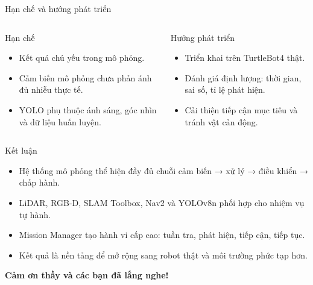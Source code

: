 ﻿\documentclass[aspectratio=169,11pt]{beamer}
\begin{document}
\begin{frame}{Hạn chế và hướng phát triển}
\begin{columns}[T]
\begin{block}{Hạn chế}
\begin{itemize}
  \item Kết quả chủ yếu trong mô phỏng.
  \item Cảm biến mô phỏng chưa phản ánh đủ nhiễu thực tế.
  \item YOLO phụ thuộc ánh sáng, góc nhìn và dữ liệu huấn luyện.
\end{itemize}
\end{block}
\begin{block}{Hướng phát triển}
\begin{itemize}
  \item Triển khai trên TurtleBot4 thật.
  \item Đánh giá định lượng: thời gian, sai số, tỉ lệ phát hiện.
  \item Cải thiện tiếp cận mục tiêu và tránh vật cản động.
\end{itemize}
\end{block}
\end{columns}
\end{frame}

\begin{frame}{Kết luận}
\begin{itemize}
  \item Hệ thống mô phỏng thể hiện đầy đủ chuỗi cảm biến → xử lý → điều khiển → chấp hành.
  \item LiDAR, RGB-D, SLAM Toolbox, Nav2 và YOLOv8n phối hợp cho nhiệm vụ tự hành.
  \item Mission Manager tạo hành vi cấp cao: tuần tra, phát hiện, tiếp cận, tiếp tục.
  \item Kết quả là nền tảng để mở rộng sang robot thật và môi trường phức tạp hơn.
\end{itemize}
\vspace{0.35cm}
\begin{center}
{\Large\bfseries Cảm ơn thầy và các bạn đã lắng nghe!}
\end{center}
\end{frame}
\end{document}
